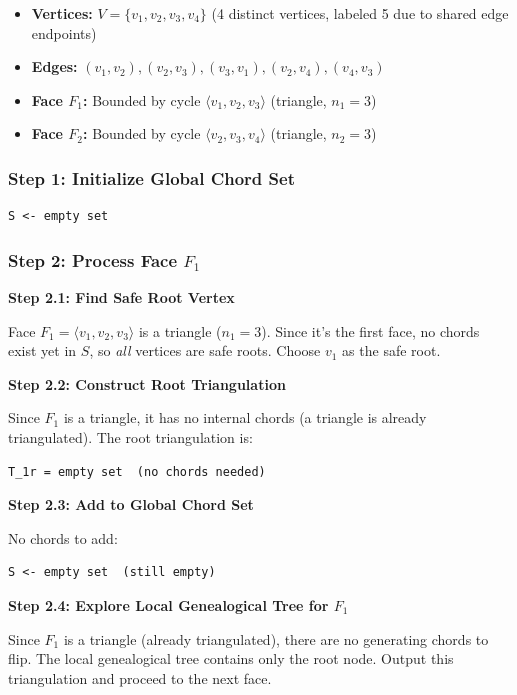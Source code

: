 \documentclass[12pt,a4paper]{article}
\theoremstyle{definition}
\theoremstyle{remark}
\begin{document}
\begin{itemize}
    \item \textbf{Vertices:} $V = \{v_1, v_2, v_3, v_4\}$ (4 distinct vertices, labeled 5 due to shared edge endpoints)
    \item \textbf{Edges:} $(v_1, v_2), (v_2, v_3), (v_3, v_1), (v_2, v_4), (v_4, v_3)$
    \item \textbf{Face $F_1$:} Bounded by cycle $\langle v_1, v_2, v_3 \rangle$ (triangle, $n_1 = 3$)
    \item \textbf{Face $F_2$:} Bounded by cycle $\langle v_2, v_3, v_4 \rangle$ (triangle, $n_2 = 3$)
\end{itemize}

\subsubsection{Step 1: Initialize Global Chord Set}

\begin{verbatim}
S <- empty set
\end{verbatim}

\subsubsection{Step 2: Process Face $F_1$}

\textbf{Step 2.1: Find Safe Root Vertex}

Face $F_1 = \langle v_1, v_2, v_3 \rangle$ is a triangle ($n_1 = 3$). Since it's the first face, no chords exist yet in $S$, so \emph{all} vertices are safe roots. Choose $v_1$ as the safe root.

\textbf{Step 2.2: Construct Root Triangulation}

Since $F_1$ is a triangle, it has no internal chords (a triangle is already triangulated). The root triangulation is:
\begin{verbatim}
T_1r = empty set  (no chords needed)
\end{verbatim}

\textbf{Step 2.3: Add to Global Chord Set}

No chords to add:
\begin{verbatim}
S <- empty set  (still empty)
\end{verbatim}

\textbf{Step 2.4: Explore Local Genealogical Tree for $F_1$}

Since $F_1$ is a triangle (already triangulated), there are no generating chords to flip. The local genealogical tree contains only the root node. Output this triangulation and proceed to the next face.
\end{document}
